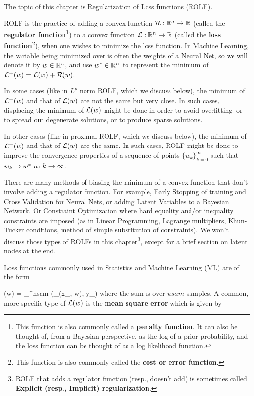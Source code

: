  The topic
 of this chapter is Regularization of Loss functions (ROLF).

ROLF is the practice of adding
a convex function  ${\cal R}:{ \mathbb{R}}^n\rightarrow { \mathbb{R}}$
(called the {\bf regulator function}\footnote{This function is also commonly called a {\bf penalty function}.
It can  also be thought  of, from a Bayesian perspective,
as the log of a prior probability, and the loss function can be thought of as a log likelihood function.}) to
a convex function  ${\cal L}:{ \mathbb{R}}^n\rightarrow { \mathbb{R}}$
(called the {\bf  loss function}\footnote{This function is also commonly
called the {\bf cost or error function}.}), when one
wishes to minimize the loss function. In Machine Learning,
the variable being minimized over is often the weights
of a Neural Net, so we will denote it by $w\in { \mathbb{R}}^n$, and use $w^*\in { \mathbb{R}}^n$
to represent the
minimum of ${\cal L}^+(w) ={\cal L}(w)+ {\cal R}(w)$.

In some cases (like in $L^p$ norm ROLF,
which we discuss below),
the minimum of ${\cal L}^+(w)$
and that of ${\cal L}(w)$
are not the same but very close. In such cases,
displacing the minimum of
${\cal L}(w)$
might be done in order
to avoid overfitting, or
to spread out degenerate solutions, or to produce
sparse solutions.

In other cases (like in proximal ROLF, which we discuss below),
the minimum of ${\cal L}^+(w)$
and that of ${\cal L}(w)$
are the  same.
In such cases, ROLF might be done
to improve the
convergence properties
of a sequence of points
$\{w_k\}_{k=0}^\infty$
such that $w_k\rightarrow w^*$
as $k
\rightarrow \infty$.

There are many methods
of biasing the
minimum of a convex function that  don't
involve adding a regulator
function.
For example, Early Stopping
of training
and Cross Validation for Neural Nets,
or adding Latent Variables
to a Bayesian Network.
Or Constraint Optimization where hard equality and/or inequality constraints are imposed (as in Linear Programming,
Lagrange multipliers, Khun-Tucker conditions, method of simple substitution of constraints).
We won't discuss those types of
ROLFs in this chapter\footnote{ROLF that adds a regulator function (resp., doesn't add)
is sometimes called {\bf Explicit (resp., Implicit)
regularization}.}, except for a brief section on latent nodes at the end.



Loss functions commonly used in Statistics and
Machine Learning (ML) are of the form


\beq
\call(w) = \sum_{}^{nsam}
\HAT{\call}(\haty_\s(x_\s, w), y_\s)
\eeq
where the sum is over $nsam$ samples.
A common, more specific type of ${\cal L}(w)$ is the
{\bf mean square error} which is
given by


